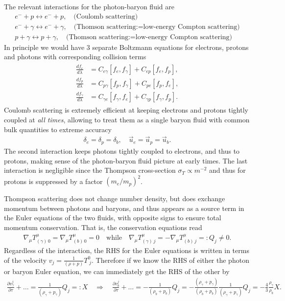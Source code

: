 The relevant interactions for the photon-baryon fluid are
\begin{align}
    e^-+p \leftrightarrow e^-+p, \quad \text{(Coulomb scattering)}\\
    e^-+\gamma \leftrightarrow e^-+\gamma, \quad \text{(Thomson scattering:=low-energy Compton scattering)}\\
    p+\gamma \leftrightarrow p+\gamma, \quad \text{(Thomson scattering:=low-energy Compton scattering)}
\end{align}
In principle we would have 3 separate Boltzmann equations for electrons, protons and photons with corresponding collision terms
\begin{align}
\begin{aligned}
    \frac{d f_e}{d\lambda}&=C_{e\gamma}[f_e,f_\gamma]+C_{ep}[f_e,f_p],\\
    \frac{d f_p}{d\lambda}&=C_{p\gamma}[f_p,f_\gamma]+C_{pe}[f_p,f_e],\\
    \frac{d f_\gamma}{d\lambda}&=C_{\gamma e}[f_\gamma,f_e]+C_{\gamma p}[f_\gamma,f_p].
\end{aligned}
\end{align}
Coulomb scattering is extremely efficient at keeping electrons and protons tightly coupled at \emph{all times}, allowing to treat them as a single baryon fluid with common bulk quantities to extreme accuracy
\begin{align}
    \delta_e=\delta_p=\delta_b, \quad \vec{u}_e=\vec{u}_p=\vec{u}_b.
\end{align}
The second interaction keeps photons tightly coupled to electrons, and thus to protons, making sense of the photon-baryon fluid picture at early times.
The last interaction is negligible since the Thompson cross-section $\sigma_T \propto m^{-2}$ and thus for protons is suppressed by a factor $(m_e/m_p)^2$.

Thompson scattering does not change number density, but does exchange momentum between photons and baryons, and thus appears as a source term in the Euler equations of the two fluids, with opposite signs to ensure total momentum conservation.
That is, the conservation equations read
\begin{align}
    \nabla_\mu T^\mu_{(\gamma)\,0}=\nabla_\mu T^\mu_{(b)\,0}=0\quad \text{while}\quad \nabla_\mu T^\mu_{(\gamma)\,j}=-\nabla_\mu T^\mu_{(b)\,j}=:Q_j\neq 0.
\end{align}
Regardless of the interaction, the RHS for the Euler equations is written in terms of the velocity $v_j=\frac{1}{(\rho+p)}T^0_{\;j}$.
Therefore if we know the RHS of either the photon or baryon Euler equation, we can immediately get the RHS of the other by
{\small
\begin{align}
    \frac{\partial v_\gamma^j}{\partial \tau}+\ldots = \frac{1}{(\rho_\gamma+p_\gamma)} Q_j=:X\quad\Rightarrow\quad \frac{\partial v_b^j}{\partial \tau}+\ldots = -\frac{1}{(\rho_b+p_b)} Q_j = -\frac{(\rho_\gamma+p_\gamma)}{(\rho_b+p_b)} \frac{1}{(\rho_\gamma+p_\gamma)} Q_j = -\frac{4}{3} \frac{\rho_\gamma}{\rho_b} X.
\end{align}}


